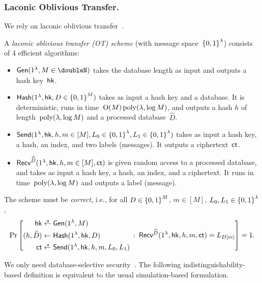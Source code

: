 \subsubsection{Laconic Oblivious Transfer.}
We rely on laconic oblivious transfer~\cite{C:CDGGMP17}.

\begin{definition}\label{def:lot}
A \emph{laconic oblivious transfer (OT) scheme} (with message space~${\{0,1\}}^\lambda$) consists of 4 efficient algorithms:
\begin{itemize}
\item $\Gen(1^\lambda,{M\in\doubleN})$ takes the database length as input and outputs a hash key~$\hk$.
\item $\Hash(1^\lambda,\hk,{D\in\bit^M})$ takes as input a hash key and a database.
It is deterministic,
runs in time~$\operatorname{O}(M)\operatorname{poly}(\lambda,\log M)$, and
outputs a hash $h$ of length~$\operatorname{poly}(\lambda,\log M)$ and a processed database~$\widehat{D}$.
\item $\Send(1^\lambda,\hk,h,{m\in[M]},{L_0\in\bit^\lambda},{L_1\in\bit^\lambda})$
takes as input a hash key, a hash, an index, and two labels (messages).
It outputs a ciphertext~$\ct$.
\item $\Recv^{\widehat{D}}(1^\lambda,\hk,h,{m\in[M]},\ct)$
is given random access to a processed database, and
takes as input a hash key, a hash, an index, and a ciphertext.
It runs in time~$\operatorname{poly}(\lambda,\log M)$ and outputs a label (message).
\end{itemize}
The scheme must be \emph{correct}, i.e., for all
${D\in{\{0,1\}}^M}$,
${m\in[M]}$,
${L_0,L_1\in{\{0,1\}}^\lambda}$,
\begin{align*}
\Pr\left[
\begin{aligned}
\hk&{}\draws\Gen(1^\lambda,M)\\
(h,\widehat{D})&{}\gets\Hash(1^\lambda,\hk,D)\\
\ct&{}\draws\Send(1^\lambda,\hk,h,m,L_0,L_1)
\end{aligned}
\::\:
\Recv^{\widehat{D}}(1^\lambda,\hk,h,m,\ct)=L_{D[m]}
\right]=1.
\end{align*}
\end{definition}

\noindent
We only need database-selective security~\cite{TCC:AnaLom18}.
The following indistinguishability-based definition is equivalent to the usual simulation-based formulation.

